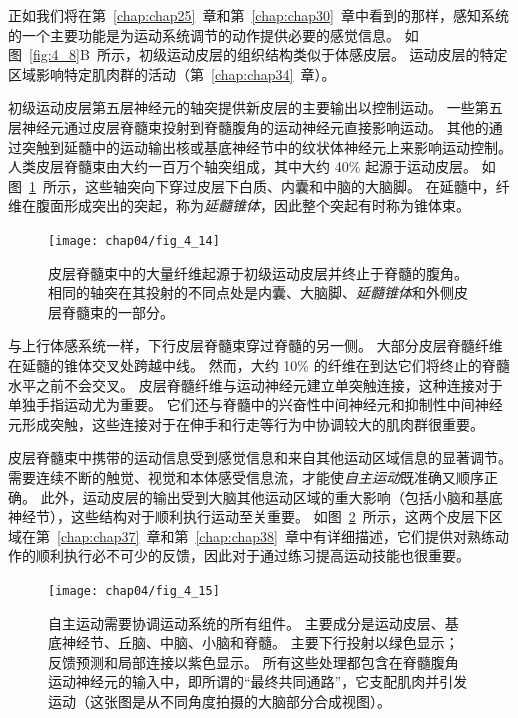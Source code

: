 正如我们将在第~\ref{chap:chap25}~章和第~\ref{chap:chap30}~章中看到的那样，感知系统的一个主要功能是为运动系统调节的动作提供必要的感觉信息。 
如图~\ref{fig:4_8}B~所示，初级运动皮层的组织结构类似于体感皮层。 
运动皮层的特定区域影响特定肌肉群的活动（第~\ref{chap:chap34}~章）。


初级运动皮层第五层神经元的轴突提供新皮层的主要输出以控制运动。
一些第五层神经元通过皮层脊髓束投射到脊髓腹角的运动神经元直接影响运动。
其他的通过突触到延髓中的运动输出核或基底神经节中的纹状体神经元上来影响运动控制。
人类皮层脊髓束由大约一百万个轴突组成，其中大约 40\% 起源于运动皮层。
如图~\ref{fig:4_14}~所示，这些轴突向下穿过皮层下白质、内囊和中脑的大脑脚。
在延髓中，纤维在腹面形成突出的突起，称为\textit{延髓锥体}，因此整个突起有时称为锥体束。


\begin{figure}[htbp]
	\centering
	\texttt{[image: chap04/fig\_4\_14]}
	\caption{皮层脊髓束中的大量纤维起源于初级运动皮层并终止于脊髓的腹角。
		相同的轴突在其投射的不同点处是内囊、大脑脚、\textit{延髓锥体}和外侧皮层脊髓束的一部分。}
	\label{fig:4_14}
\end{figure}


与上行体感系统一样，下行皮层脊髓束穿过脊髓的另一侧。 
大部分皮层脊髓纤维在延髓的锥体交叉处跨越中线。
然而，大约 10\% 的纤维在到达它们将终止的脊髓水平之前不会交叉。 
皮层脊髓纤维与运动神经元建立单突触连接，这种连接对于单独手指运动尤为重要。 
它们还与脊髓中的兴奋性中间神经元和抑制性中间神经元形成突触，这些连接对于在伸手和行走等行为中协调较大的肌肉群很重要。


皮层脊髓束中携带的运动信息受到感觉信息和来自其他运动区域信息的显著调节。
需要连续不断的触觉、视觉和本体感受信息流，才能使\textit{自主运动}既准确又顺序正确。
此外，运动皮层的输出受到大脑其他运动区域的重大影响（包括小脑和基底神经节），这些结构对于顺利执行运动至关重要。
如图~\ref{fig:4_15}~所示，这两个皮层下区域在第~\ref{chap:chap37}~章和第~\ref{chap:chap38}~章中有详细描述，它们提供对熟练动作的顺利执行必不可少的反馈，因此对于通过练习提高运动技能也很重要。

\begin{figure}[htbp]
	\centering
	\texttt{[image: chap04/fig\_4\_15]}
	\caption{自主运动需要协调运动系统的所有组件。
		主要成分是运动皮层、基底神经节、丘脑、中脑、小脑和脊髓。
		主要下行投射以绿色显示；
		反馈预测和局部连接以紫色显示。
		所有这些处理都包含在脊髓腹角运动神经元的输入中，即所谓的“最终共同通路”，它支配肌肉并引发运动（这张图是从不同角度拍摄的大脑部分合成视图）。}
	\label{fig:4_15}
\end{figure}



